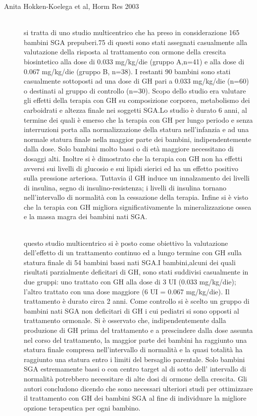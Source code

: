 \begin{description}
\item[Anita Hokken-Koelega et al, Horm Res 2003] \hfill \\
si tratta di uno studio multicentrico che ha preso in considerazione 165 bambini SGA prepuberi.75 di questi sono stati assegnati casualmente alla valutazione della risposta al trattamento con ormone della crescita biosintetico alla dose di 0.033 mg/kg/die (gruppo A,n=41) e alla dose di 0.067 mg/kg/die (gruppo B, n=38). I restanti 90 bambini sono stati casualmente sottoposti ad una dose di GH pari a 0.033 mg/kg/die (n=60) o destinati al gruppo di controllo (n=30). Scopo dello studio era valutare gli effetti della terapia con GH su composizione corporea, metabolismo dei carboidrati e altezza finale nei soggetti SGA.Lo studio è durato 6 anni, al termine dei quali è emerso che la terapia con GH per lungo periodo e senza interruzioni porta alla normalizzazione della statura nell'infanzia e ad una normale statura finale nella maggior parte dei bambini, indipendentemente dalla dose. Solo bambini molto bassi o di età maggiore necessitano di dosaggi alti. Inoltre si è dimostrato che la terapia con GH non ha effetti avversi sui livelli di glucosio e sui lipidi sierici ed ha un effetto positivo sulla pressione arteriosa. Tuttavia il GH induce un innalzamento dei livelli  di insulina, segno di insulino-resistenza; i livelli di insulina tornano nell'intervallo di normalità con la cessazione della terapia. Infine si è visto che la terapia con GH migliora significativamente la mineralizzazione ossea e la massa magra dei bambini nati SGA. 

\item[{\parbox[t]{18cm}{Yvonne Van Pareren et al,\\The journal of clinical endocrinology \& metabolism 2003}}] \hfill \\
 questo studio multicentrico si è posto come obiettivo la valutazione dell'effetto di un trattamento continuo ed a lungo termine con GH sulla statura finale di 54 bambini bassi nati SGA.I bambini,alcuni dei quali risultati parzialmente  deficitari di GH, sono stati suddivisi casualmente in due gruppi: uno trattato con GH alla dose di 3 UI (0.033 mg/kg/die); l'altro trattato con una dose maggiore (6 UI = 0.067 mg/kg/die). Il trattamento è durato circa 2 anni. Come controllo si è scelto un gruppo di bambini nati SGA non deficitari di GH i cui pediatri si sono opposti al trattamento ormonale. Si è osservato che, indipendentemente dalla produzione di GH prima del trattamento e a prescindere dalla dose assunta nel corso del trattamento, la maggior parte dei bambini ha raggiunto una statura finale compresa nell'intervallo di normalità e la quasi totalità ha raggiunto una statura entro i limiti del bersaglio parentale. Solo bambini SGA estremamente bassi o con centro target al di sotto dell' intervallo di normalità potrebbero necessitare di alte dosi di ormone della crescita. Gli autori concludono dicendo che sono necessari ulteriori studi per ottimizzare il trattamento con GH dei bambini SGA al fine di individuare la migliore opzione terapeutica per ogni bambino. 


\end{description}
